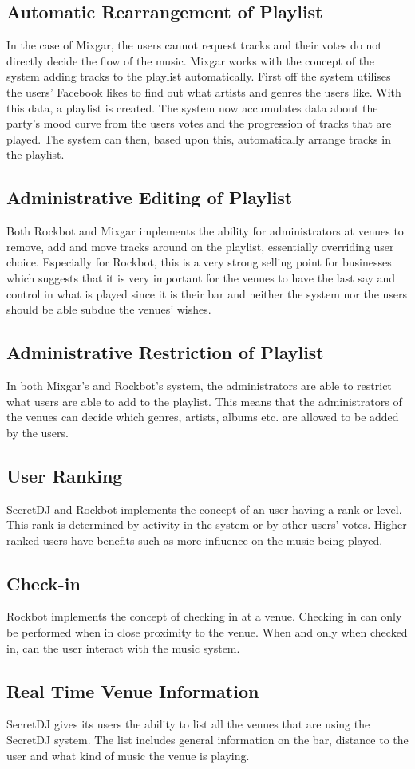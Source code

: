 \subsection{Automatic Rearrangement of Playlist}
\label{sub:auto_rearrange_playlist}
In the case of Mixgar, the users cannot request tracks and their votes
do not directly decide the flow of the music. 
Mixgar works with the concept of the system adding tracks to the playlist
automatically. First off the system utilises the users’ Facebook likes
to find out what artists and genres the users like. With this data, a
playlist is created. The system now accumulates data about the party’s
mood curve from the users votes and the progression of tracks that are played. The system
can then, based upon this, automatically arrange tracks in the
playlist.

\subsection{Administrative Editing of Playlist}
Both Rockbot and
Mixgar implements the ability for administrators at venues to remove, add
and move tracks around on the playlist, essentially overriding user choice. Especially for Rockbot, this
is a very strong selling point for businesses which suggests that it
is very important for the venues to have the last say and control in
what is played since it is their bar and neither the system nor the users
should be able subdue the venues' wishes.

\subsection{Administrative Restriction of Playlist}
In both Mixgar's and Rockbot's system, the administrators are able to
restrict what users are able to add to the playlist. This means that
the administrators of the venues can decide which genres, artists,
albums etc. are allowed to be added by the users.

\subsection{User Ranking}
SecretDJ and Rockbot implements the concept of an user having a rank or
level. This rank is determined by activity in the system or by other
users' votes. Higher ranked users have benefits such as more influence on the music being played.

\subsection{Check-in}
Rockbot implements the concept of checking in at a venue. Checking in
can only be performed when in close proximity to the venue. When and
only when checked in, can the user interact with the music system.

\subsection{Real Time Venue Information}
SecretDJ gives its users the ability to list all the venues that are
using the SecretDJ system. The list includes general information on
the bar, distance to the user and what kind of music the venue is
playing.
